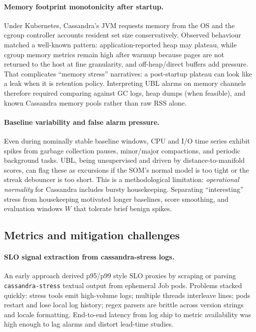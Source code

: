 \documentclass[11pt,a4paper]{article}
\begin{document}
\paragraph{Memory footprint monotonicity after startup.}
Under Kubernetes, Cassandra's JVM requests memory from the OS and the cgroup controller accounts resident set size conservatively. Observed behaviour matched a well-known pattern: application-reported heap may plateau, while cgroup memory metrics remain high after warmup because pages are not returned to the host at fine granularity, and off-heap/direct buffers add pressure. That complicates ``memory stress'' narratives: a post-startup plateau can look like a leak when it is retention policy. Interpreting UBL alarms on memory channels therefore required comparing against GC logs, heap dumps (when feasible), and known Cassandra memory pools rather than raw RSS alone.

\paragraph{Baseline variability and false alarm pressure.}
Even during nominally stable baseline windows, CPU and I/O time series exhibit spikes from garbage collection pauses, minor/major compactions, and periodic background tasks. UBL, being unsupervised and driven by distance-to-manifold scores, can flag these as excursions if the SOM's normal model is too tight or the streak debouncer is too short. This is a methodological limitation: \emph{operational normality} for Cassandra includes bursty housekeeping. Separating ``interesting'' stress from housekeeping motivated longer baselines, score smoothing, and evaluation windows $W$ that tolerate brief benign spikes.

\subsection{Metrics and mitigation challenges}
\label{subsec:challenges-metrics-mitigation}

\paragraph{SLO signal extraction from cassandra-stress logs.}
An early approach derived p95/p99 style SLO proxies by scraping or parsing \texttt{cassandra-stress} textual output from ephemeral Job pods. Problems stacked quickly: stress tools emit high-volume logs; multiple threads interleave lines; pods restart and lose local log history; regex parsers are brittle across version strings and locale formatting. End-to-end latency from log ship to metric availability was high enough to lag alarms and distort lead-time studies.
\end{document}
